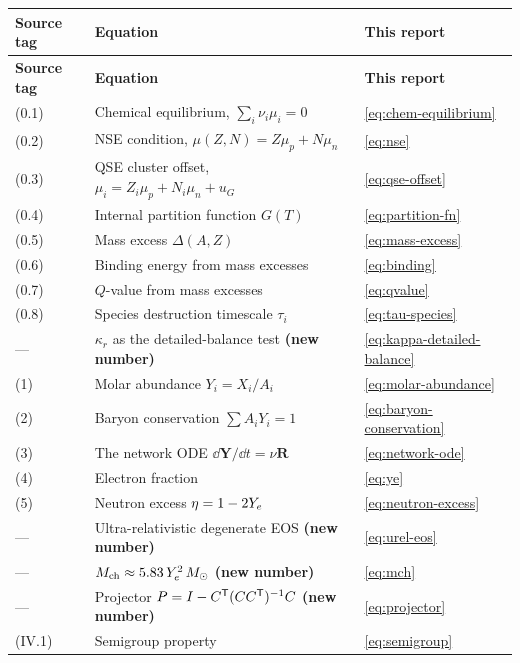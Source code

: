 \begingroup
\small
\begin{longtable}{@{}l p{7.4cm} l@{}}
\toprule
\textbf{Source tag} & \textbf{Equation} & \textbf{This report} \\
\midrule
\endfirsthead
\toprule
\textbf{Source tag} & \textbf{Equation} & \textbf{This report} \\
\midrule
\endhead
\bottomrule
\endfoot
\bottomrule
\endlastfoot
(0.1)  & Chemical equilibrium, $\sum_i \nu_i\mu_i = 0$ &
         \eqref{eq:chem-equilibrium} \\
(0.2)  & NSE condition, $\mu(Z,N) = Z\mu_p + N\mu_n$ & \eqref{eq:nse} \\
(0.3)  & QSE cluster offset, $\mu_i = Z_i\mu_p + N_i\mu_n + u_G$ &
         \eqref{eq:qse-offset} \\
(0.4)  & Internal partition function $G(T)$ & \eqref{eq:partition-fn} \\
(0.5)  & Mass excess $\Delta(A,Z)$ & \eqref{eq:mass-excess} \\
(0.6)  & Binding energy from mass excesses & \eqref{eq:binding} \\
(0.7)  & $Q$-value from mass excesses & \eqref{eq:qvalue} \\
(0.8)  & Species destruction timescale $\tau_i$ & \eqref{eq:tau-species} \\
---    & $\kappa_r$ as the detailed-balance test \textbf{(new number)} &
         \eqref{eq:kappa-detailed-balance} \\
(1)    & Molar abundance $Y_i = X_i/A_i$ & \eqref{eq:molar-abundance} \\
(2)    & Baryon conservation $\sum A_i Y_i = 1$ &
         \eqref{eq:baryon-conservation} \\
(3)    & The network ODE $\dd\mathbf{Y}/\dd t = \nu\mathbf{R}$ &
         \eqref{eq:network-ode} \\
(4)    & Electron fraction \Ye{} & \eqref{eq:ye} \\
(5)    & Neutron excess $\eta = 1 - 2Y_{e}$ &
         \eqref{eq:neutron-excess} \\
---    & Ultra-relativistic degenerate EOS \textbf{(new number)} &
         \eqref{eq:urel-eos} \\
---    & $M_{\mathrm{ch}} \approx 5.83\,Y_e^2\,M_{\odot}$ \textbf{(new number)} &
         \eqref{eq:mch} \\
---    & Projector $P = I - C^{\mathsf{T}}(CC^{\mathsf{T}})^{-1}C$ \textbf{(new number)} &
         \eqref{eq:projector} \\
(IV.1) & Semigroup property & \eqref{eq:semigroup} \\

\end{longtable}
